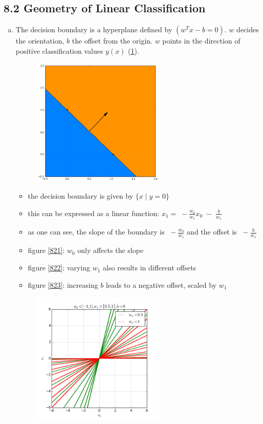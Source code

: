 \documentclass[10pt,a4paper]{article}
\begin{document}
\subsection*{8.2 Geometry of Linear Classification}
\begin{enumerate}[a)]
\item
The decision boundary is a hyperplane defined by $(w^Tx - b = 0)$. $w$ decides the orientation,
$b$ the offset from the origin. $w$ points in the direction of positive classification values $y(x)$ (\ref{820}).
\begin{figure}[h]
	\centering
	\includegraphics[width=0.6\textwidth]{820.png}
    \caption{}
	\label{820}
\end{figure}
\begin{itemize}
\item the decision boundary is given by $\{x\;|\;y=0\}$
\item this can be expressed as a linear function: $x_1 = \;-\frac{w_0}{w_1}x_0 \;-\; \frac{b}{w_1}$
\item as one can see, the slope of the boundary is $\;-\frac{w_0}{w_1}$ and the offset is $\;-\frac{b}{w_1}$
    \item figure \ref{821}: $w_0$ only affects the slope
    \item figure \ref{822}: varying $w_1$ also results in different offsets
    \item figure \ref{823}: increasing $b$ leads to a negative offset, scaled by $w_1$
\end{itemize}
\begin{figure}[h]
	\centering
	\includegraphics[width=0.6\textwidth]{821.png}

\end{figure}
\end{enumerate}
\end{document}
